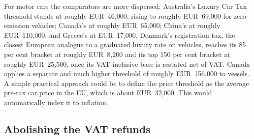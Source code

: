 \documentclass[../../main]{subfiles}
\begin{document}

For motor cars the comparators are more dispersed: Australia's Luxury Car Tax threshold stands at
roughly EUR~46{,}000, rising to roughly EUR~69{,}000 for zero-emission vehicles; Canada's at
roughly EUR~65{,}000; China's at roughly EUR~110{,}000; and Greece's at EUR~17{,}000. %
Denmark's registration tax, the closest European analogue to a graduated luxury rate on vehicles,
reaches its 85 per cent bracket at roughly EUR~8{,}200 and its top 150 per cent bracket at roughly
EUR~25{,}500, once its VAT-inclusive base is restated net of VAT. Canada applies a separate and
much higher threshold of roughly EUR~156{,}000 to vessels. A simple practical approach could be to define the price threshold as the average pre-tax car price in the EU, which is about EUR~32{,}000. This would automatically index it to inflation.


\subsection{Abolishing the VAT refunds}
\end{document}

